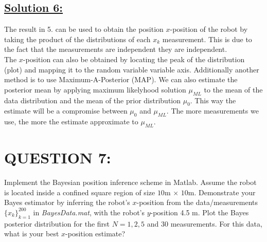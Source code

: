 \documentclass[a4paper,11pt]{article}
\begin{document}
\subsection*{\underline{Solution 6:}}
The result in 5. can be used to obtain the position $x$-position of the robot by taking the product of the distributions of each $x_k$ measurement. This is due to the fact that the measurements are independent they are independent.\\
The $x$-position can also be obtained by locating the peak of the distribution (plot) and mapping it to the random variable variable axis. Additionally another method is to use Maximum-A-Posterior (MAP). We can also estimate the posterior mean by applying maximum likelyhood solution $\mu_{ML}$ to the mean of the data distribution and the mean of the prior distribution $\mu_0$. This way the estimate will be a compromise between $\mu_0$ and $\mu_{ML}$. The more measurements we use, the more the estimate approximate to $\mu_{ML}$.

\section{QUESTION 7:}
Implement the Bayesian position inference scheme in Matlab. Assume the robot is
located inside a confined square region of size $10$m $\times$ $10$m. Demonstrate your Bayes
estimator by inferring the robot’s $x$-position from the data/measurements $\{ x_k \}^{200} _{k = 1}$ in \emph{BayesData.mat}, with the robot’s $y$-position 4.5 m. Plot the Bayes posterior distribution for the first $N = 1, 2, 5$ and $30$ measurements. For this data, what is your best $x$-position estimate?
\end{document}

